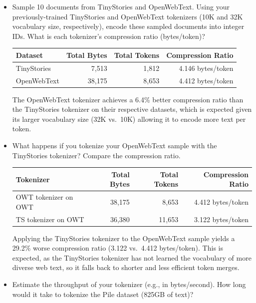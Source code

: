 \documentclass[letterpaper]{article}
\begin{document}
\begin{itemize}
	\item[(a)] Sample 10 documents from TinyStories and OpenWebText. Using your previously-trained TinyStories and OpenWebText tokenizers (10K and 32K vocabulary size, respectively), encode these sampled documents into integer IDs. What is each tokenizer’s compression ratio (bytes/token)?

\begin{center}
\begin{tabular}{lrrr}
\hline
\textbf{Dataset} & \textbf{Total Bytes} & \textbf{Total Tokens} & \textbf{Compression Ratio} \\
\hline
TinyStories & 7,513 & 1,812 & 4.146 bytes/token \\
OpenWebText & 38,175 & 8,653 & 4.412 bytes/token\\
\hline
\end{tabular}
\end{center}

	The OpenWebText tokenizer achieves a 6.4\% better compression ratio than the TinyStories tokenizer on their respective datasets, which is expected given its larger vocabulary size (32K vs.\ 10K) allowing it to encode more text per token.

	\item[(b)] What happens if you tokenize your OpenWebText sample with the TinyStories tokenizer? Compare the compression ratio.

\begin{center}
\begin{tabular}{lrrr}
\hline
\textbf{Tokenizer} & \textbf{Total Bytes} & \textbf{Total Tokens} & \textbf{Compression Ratio} \\
\hline
OWT tokenizer on OWT & 38,175 & 8,653 & 4.412 bytes/token \\
TS tokenizer on OWT & 36,380 & 11,653 & 3.122 bytes/token \\
\hline
\end{tabular}
\end{center}

	Applying the TinyStories tokenizer to the OpenWebText sample yields a 29.2\% worse compression ratio (3.122 vs.\ 4.412 bytes/token). This is expected, as the TinyStories tokenizer has not learned the vocabulary of more diverse web text, so it falls back to shorter and less efficient token merges.

	\item[(c)] Estimate the throughput of your tokenizer (e.g., in bytes/second). How long would it take to tokenize the Pile dataset (825GB of text)?


\end{itemize}
\end{document}
